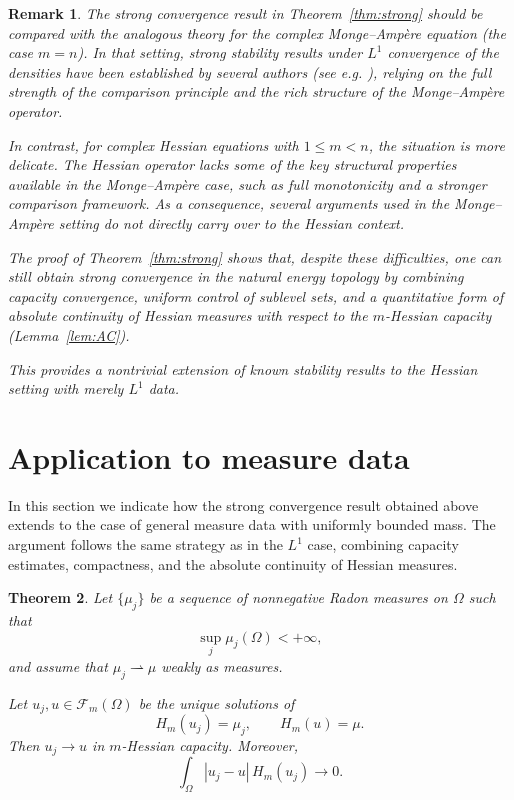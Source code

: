 \documentclass[10pt,a4paper]{amsart}
\newtheorem{theorem}{Theorem}[section]
\newtheorem{remark}[theorem]{Remark}
\begin{document}
\begin{remark}
	The strong convergence result in Theorem~\ref{thm:strong} should be compared 
	with the analogous theory for the complex Monge--Amp\`ere equation (the case $m=n$). 
	In that setting, strong stability results under $L^1$ convergence of the densities 
	have been established by several authors (see e.g. \cite{DinewPlis, Liu-Zhang}), 
	relying on the full strength of the comparison principle and the rich structure 
	of the Monge--Amp\`ere operator.
	
	In contrast, for complex Hessian equations with $1 \le m < n$, the situation is 
	more delicate. The Hessian operator lacks some of the key structural properties 
	available in the Monge--Amp\`ere case, such as full monotonicity and a stronger 
	comparison framework. As a consequence, several arguments used in the 
	Monge--Amp\`ere setting do not directly carry over to the Hessian context.
	
	The proof of Theorem~\ref{thm:strong} shows that, despite these difficulties, 
	one can still obtain strong convergence in the natural energy topology 
	by combining capacity convergence, uniform control of sublevel sets, 
	and a quantitative form of absolute continuity of Hessian measures 
	with respect to the $m$-Hessian capacity (Lemma~\ref{lem:AC}).
	
	This provides a nontrivial extension of known stability results to the 
	Hessian setting with merely $L^1$ data.
\end{remark}
\section{Application to measure data}

In this section we indicate how the strong convergence result obtained above
extends to the case of general measure data with uniformly bounded mass.
The argument follows the same strategy as in the $L^1$ case, combining
capacity estimates, compactness, and the absolute continuity of Hessian measures.

\medskip


\begin{theorem}\label{thm:measure_stability}
	Let $\{\mu_j\}$ be a sequence of nonnegative Radon measures on $\Omega$
	such that
	\[
	\sup_j \mu_j(\Omega) < +\infty,
	\]
	and assume that $\mu_j \rightharpoonup \mu$ weakly as measures.
	
	Let $u_j, u \in \mathcal{F}_m(\Omega)$ be the unique solutions of
	\[
	H_m(u_j) = \mu_j,
	\qquad
	H_m(u) = \mu.
	\]
	Then $u_j \to u$ in $m$-Hessian capacity. Moreover,
	\[
	\int_\Omega |u_j - u| \, H_m(u_j) \longrightarrow 0.
	\]
\end{theorem}
\end{document}
